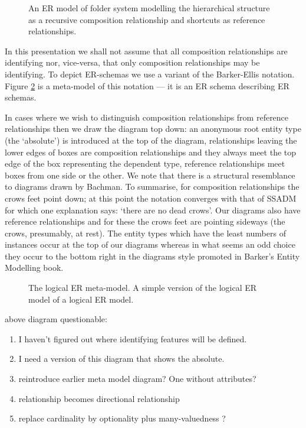 \begin{figure}[H]
\begin{center}

\end{center}
\caption{An ER model of folder system modelling the hierarchical structure as a recursive composition relationship and shortcuts as reference relationships.}
\label{filesystem2}
\end{figure}

In this presentation we shall not assume that all composition relationships are identifying nor, vice-versa, that only composition relationships may be identifying. To depict ER-schemas we use a variant of the Barker-Ellis notation. 
Figure \ref{entityRelationalMetaModel1} is a meta-model of this notation — it is an ER schema describing ER schemas.

In cases where we wish to distinguish composition relationships from reference relationships then we draw the diagram top down: an anonymous root entity type (the ‘absolute’) is introduced at the top of the diagram, relationships leaving the lower edges of boxes are composition relationships and they always meet the top edge of the box representing the dependent type, reference relationships meet boxes from one side or the other. We note that there is a structural resemblance to diagrams drawn by Bachman. To summarise, for composition relationships the crows feet point down; at this point the notation converges with that of SSADM for which one explanation says: ‘there are no dead crows’. Our diagrams also have reference relationships and for these the crows feet are pointing sideways (the crows, presumably, at rest). The entity types which have the least numbers of instances occur at the top of our diagrams whereas in what seems an odd choice they occur to the bottom right in the diagrams style promoted in Barker's Entity Modelling book.

\begin{figure}[H]
\begin{center}

\end{center}
\caption{The logical ER meta-model. A simple version of the logical ER model of a logical ER model.}
\label{entityRelationalMetaModel1}
\end{figure}

\begin{noteforfuture}
above diagram questionable:
\begin{enumerate}
\item I haven't figured out where identifying features will be defined.
\item I need a version of this diagram that shows the absolute.
\item reintroduce earlier meta model diagram? One without attributes?
\item relationship becomes directional relationship
\item replace cardinality by optionality plus many-valuedness ?
\end{enumerate}
\end{noteforfuture}






